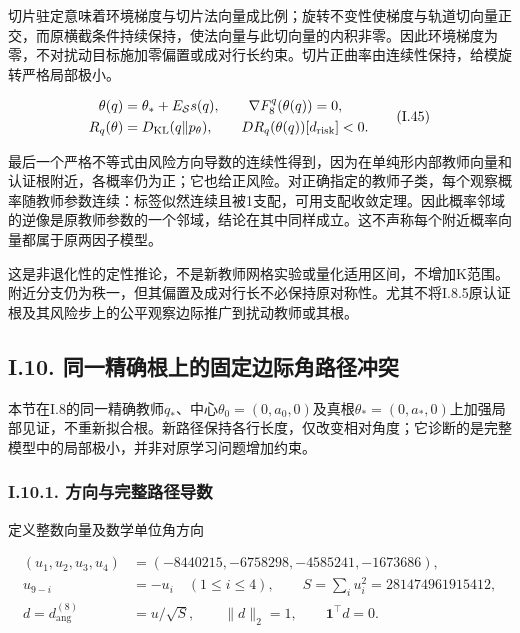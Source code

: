 \documentclass[11pt,a4paper]{article}
\begin{document}
切片驻定意味着环境梯度与切片法向量成比例；旋转不变性使梯度与轨道切向量正交，而原横截条件持续保持，使法向量与此切向量的内积非零。因此环境梯度为零，不对扰动目标施加零偏置或成对行长约束。切片正曲率由连续性保持，给模旋转严格局部极小。

\[
\begin{aligned}
\theta(q)&=\theta_*+E_{\mathcal S}s(q),\qquad
\nabla F_8^q(\theta(q))=0,\\
R_q(\theta)&=D_{\rm KL}(q\Vert p_\theta),\qquad
D R_q(\theta(q))[d_{\mathrm{risk}}]<0.
\end{aligned}
\tag{I.45}
\]

最后一个严格不等式由风险方向导数的连续性得到，因为在单纯形内部教师向量和认证根附近，各概率仍为正；它也给正风险。对正确指定的教师子类，每个观察概率随教师参数连续：标签似然连续且被1支配，可用支配收敛定理。因此概率邻域的逆像是原教师参数的一个邻域，结论在其中同样成立。这不声称每个附近概率向量都属于原两因子模型。

这是非退化性的定性推论，不是新教师网格实验或量化适用区间，不增加K范围。附近分支仍为秩一，但其偏置及成对行长不必保持原对称性。尤其不将I.8.5原认证根及其风险步上的公平观察边际推广到扰动教师或其根。

\subsection*{I.10.
同一精确根上的固定边际角路径冲突}\label{same-root-angle}

本节在I.8的同一精确教师\(q_*\)、中心\(\theta_0=(0,a_0,0)\)及真根\(\theta_*=(0,a_*,0)\)上加强局部见证，不重新拟合根。新路径保持各行长度，仅改变相对角度；它诊断的是完整模型中的局部极小，并非对原学习问题增加约束。

\subsubsection*{I.10.1.
方向与完整路径导数}\label{i.10.1.-ux65b9ux5411ux4e0eux5b8cux6574ux8defux5f84ux5bfcux6570}

定义整数向量及数学单位角方向

\[
\begin{aligned}
(u_1,u_2,u_3,u_4)&=(-8440215,-6758298,-4585241,-1673686),\\
u_{9-i}&=-u_i\quad(1\le i\le4),\qquad S=\sum_i u_i^2=281474961915412,\\
d=d_{\mathrm{ang}}^{(8)}&=u/\sqrt S,\qquad \|d\|_2=1,\qquad \mathbf1^\top d=0.
\end{aligned}
\tag{I.46}
\]
\end{document}
